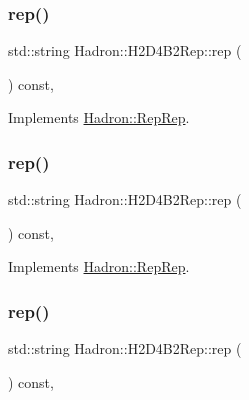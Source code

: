 \subsubsection{\texorpdfstring{rep()}{rep()}\hspace{0.1cm}{\footnotesize\ttfamily [2/5]}}
{\footnotesize\ttfamily std\+::string Hadron\+::\+H2\+D4\+B2\+Rep\+::rep (\begin{DoxyParamCaption}{ }\end{DoxyParamCaption}) const\hspace{0.3cm}{\ttfamily [inline]}, {\ttfamily [virtual]}}



Implements \mbox{\hyperlink{structHadron_1_1RepRep_ab3213025f6de249f7095892109575fde}{Hadron\+::\+Rep\+Rep}}.

\mbox{\label{structHadron_1_1H2D4B2Rep_a8d556a242b6426bf15612422a8e22ce6}} 
\subsubsection{\texorpdfstring{rep()}{rep()}\hspace{0.1cm}{\footnotesize\ttfamily [3/5]}}
{\footnotesize\ttfamily std\+::string Hadron\+::\+H2\+D4\+B2\+Rep\+::rep (\begin{DoxyParamCaption}{ }\end{DoxyParamCaption}) const\hspace{0.3cm}{\ttfamily [inline]}, {\ttfamily [virtual]}}



Implements \mbox{\hyperlink{structHadron_1_1RepRep_ab3213025f6de249f7095892109575fde}{Hadron\+::\+Rep\+Rep}}.

\mbox{\label{structHadron_1_1H2D4B2Rep_a8d556a242b6426bf15612422a8e22ce6}} 
\subsubsection{\texorpdfstring{rep()}{rep()}\hspace{0.1cm}{\footnotesize\ttfamily [4/5]}}
{\footnotesize\ttfamily std\+::string Hadron\+::\+H2\+D4\+B2\+Rep\+::rep (\begin{DoxyParamCaption}{ }\end{DoxyParamCaption}) const\hspace{0.3cm}{\ttfamily [inline]}, {\ttfamily [virtual]}}



